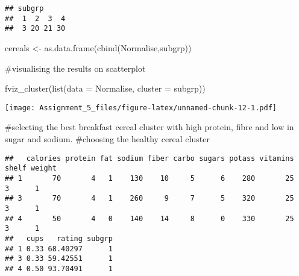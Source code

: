 \documentclass[
]{article}
\newenvironment{Shaded}{\begin{snugshade}}{\end{snugshade}}
\newcommand{\AttributeTok}[1]{\textcolor[rgb]{0.77,0.63,0.00}{#1}}
\newcommand{\DecValTok}[1]{\textcolor[rgb]{0.00,0.00,0.81}{#1}}
\newcommand{\FunctionTok}[1]{\textcolor[rgb]{0.00,0.00,0.00}{#1}}
\newcommand{\NormalTok}[1]{#1}
\newcommand{\OtherTok}[1]{\textcolor[rgb]{0.56,0.35,0.01}{#1}}
\newcommand{\SpecialCharTok}[1]{\textcolor[rgb]{0.00,0.00,0.00}{#1}}
\begin{document}
\begin{verbatim}
## subgrp
##  1  2  3  4 
##  3 20 21 30
\end{verbatim}

\begin{Shaded}
\begin{Highlighting}[]
\NormalTok{cereals }\OtherTok{\textless{}{-}} \FunctionTok{as.data.frame}\NormalTok{(}\FunctionTok{cbind}\NormalTok{(Normalise,subgrp))}
\end{Highlighting}
\end{Shaded}

\#visualising the results on scatterplot

\begin{Shaded}
\begin{Highlighting}[]
\FunctionTok{fviz\_cluster}\NormalTok{(}\FunctionTok{list}\NormalTok{(}\AttributeTok{data =}\NormalTok{ Normalise, }\AttributeTok{cluster =}\NormalTok{ subgrp))}
\end{Highlighting}
\end{Shaded}

\texttt{[image: Assignment\_5\_files/figure-latex/unnamed-chunk-12-1.pdf]}

\#selecting the best breakfast cereal cluster with high protein, fibre
and low in sugar and sodium. \#choosing the healthy cereal cluster

\begin{Shaded}
\end{Shaded}

\begin{verbatim}
##   calories protein fat sodium fiber carbo sugars potass vitamins shelf weight
## 1       70       4   1    130    10     5      6    280       25     3      1
## 3       70       4   1    260     9     7      5    320       25     3      1
## 4       50       4   0    140    14     8      0    330       25     3      1
##   cups   rating subgrp
## 1 0.33 68.40297      1
## 3 0.33 59.42551      1
## 4 0.50 93.70491      1
\end{verbatim}
\end{document}
